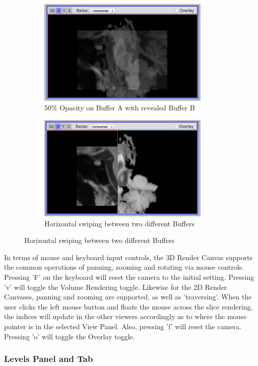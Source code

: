 \documentclass[a4paper,11pt,titlepage]{article}
\begin{document}
\begin{figure}
\centering
\begin{subfigure}{.5\textwidth}
  \centering
  \includegraphics[width=82mm]{graphics/BufferOpacity_01.png}
  \caption{50\% Opacity on Buffer A with revealed Buffer B}
\end{subfigure}%
\begin{subfigure}{.5\textwidth}
  \centering
  \includegraphics[width=82mm]{graphics/Swipe_01.png}
  \caption{Horizontal swiping between two different Buffers}
\end{subfigure}
\end{figure}




In terms of mouse and keyboard input controls, the 3D Render Canvas supports the common operations of panning, zooming and rotating via mouse controls. Pressing 'F' on the keyboard will reset the camera to the initial setting. Pressing 'v' will toggle the Volume Rendering toggle. Likewise for the 2D Render Canvases, panning and zooming are supported, as well as 'traversing'. When the user clicks the left mouse button and floats the mouse across the slice rendering, the indices will update in the other viewers accordingly as to where the mouse pointer is in the selected View Panel. Also, pressing 'f' will reset the camera. Pressing 'o' will toggle the Overlay toggle.




\subsubsection{Levels Panel and Tab}
\end{document}
